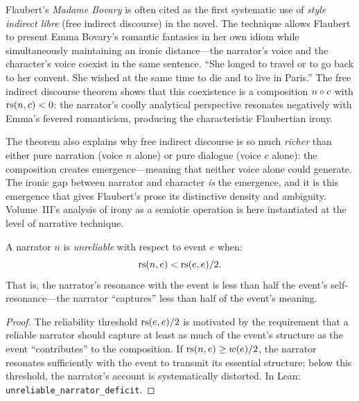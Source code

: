 \begin{interpretation}
\label{interp:flaubert-fid}
Flaubert's \textit{Madame Bovary} is often cited as the first systematic use of \emph{style indirect libre} (free indirect discourse) in the novel.  The technique allows Flaubert to present Emma Bovary's romantic fantasies in her own idiom while simultaneously maintaining an ironic distance---the narrator's voice and the character's voice coexist in the same sentence.  ``She longed to travel or to go back to her convent.  She wished at the same time to die and to live in Paris.''  The free indirect discourse theorem shows that this coexistence is a composition $n \circ c$ with $\mathrm{rs}(n, c) < 0$: the narrator's coolly analytical perspective resonates negatively with Emma's fevered romanticism, producing the characteristic Flaubertian irony.

The theorem also explains why free indirect discourse is so much \emph{richer} than either pure narration (voice $n$ alone) or pure dialogue (voice $c$ alone): the composition creates emergence---meaning that neither voice alone could generate.  The ironic gap between narrator and character \emph{is} the emergence, and it is this emergence that gives Flaubert's prose its distinctive density and ambiguity.  Volume~III's analysis of irony as a semiotic operation is here instantiated at the level of narrative technique.
\end{interpretation}

\begin{theorem}
\label{thm:unreliable-narrator}
A narrator $n$ is \emph{unreliable} with respect to event $e$ when:
\[
  \mathrm{rs}(n, e) < \mathrm{rs}(e, e) / 2.
\]
That is, the narrator's resonance with the event is less than half the event's self-resonance---the narrator ``captures'' less than half of the event's meaning.
\end{theorem}

\begin{proof}
The reliability threshold $\mathrm{rs}(e, e) / 2$ is motivated by the requirement that a reliable narrator should capture at least as much of the event's structure as the event ``contributes'' to the composition.  If $\mathrm{rs}(n, e) \geq w(e)/2$, the narrator resonates sufficiently with the event to transmit its essential structure; below this threshold, the narrator's account is systematically distorted.  In Lean: \texttt{unreliable\_narrator\_deficit}.
\end{proof}

